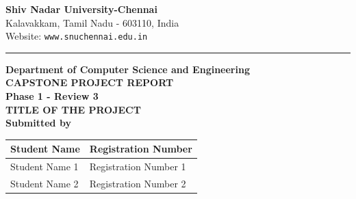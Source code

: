 \documentclass[12pt,a4paper]{report}
\begin{document}

\begin{titlepage}




\centering
{\large \textbf{Shiv Nadar University-Chennai}}\\[0.1cm]
{\normalsize Kalavakkam, Tamil Nadu - 603110, India}\\[0.1cm]
{\normalsize Website: \texttt{www.snuchennai.edu.in}}


\vspace{0.2cm}
\hrule

\begin{center}

{\large \textbf{Department of Computer Science and Engineering }}\\[1cm]

{\large \textbf{CAPSTONE PROJECT REPORT}}\\

{\large \textbf{Phase 1 - Review 3}}\\[1cm]


{\large \textbf{TITLE OF THE PROJECT}}\\[1cm]

{\large \textbf{Submitted by}}\\[0.3cm]

\begin{tabular}{p{6cm}p{5cm}}
\toprule
\centering \textbf{Student Name} &
\centering \arraybackslash \textbf{Registration Number}\\
\midrule
\centering Student Name 1 &
\centering \arraybackslash Registration Number 1\\
\centering Student Name 2 &
\centering \arraybackslash Registration Number 2\\
\bottomrule
\end{tabular}


\end{center}
\end{titlepage}
\end{document}
